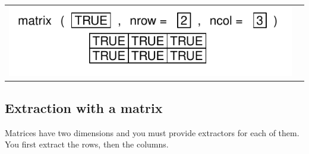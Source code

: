 \documentclass[pdflatex]{article}
\begin{document}
\begin{tabular}{cc}
\includegraphics{matrix_logical} &
\end{tabular}

\subsection{Extraction with a matrix}

Matrices have two dimensions and you must provide extractors for each of them.
You first extract the rows, then the columns.
\end{document}
